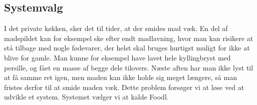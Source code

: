\subsection{Systemvalg}
I det private køkken, sker det til tider, at der smides mad væk. En del af madspildet kan for eksempel ske efter endt madlavning, hvor man kan risikere at stå tilbage med nogle fødevarer, der helst skal bruges hurtigst muligt for ikke at blive for gamle. Man kunne for eksempel have lavet hele kyllingbryst med persille, og fået en masse af begge dele tilovers. Næste aften har man ikke lyst til at få samme ret igen, men maden kan ikke holde sig meget længere, så man fristes derfor til at smide maden væk. Dette problem forsøger vi at løse ved at udvikle et system. Systemet vælger vi at kalde Foodl.
